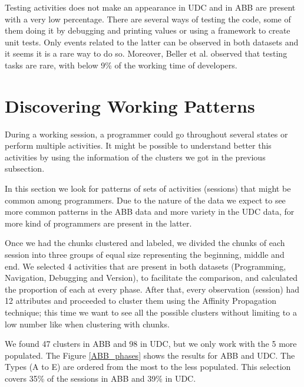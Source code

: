 \documentclass[conference]{IEEEtran}
\begin{document}
Testing activities does not make an appearance in UDC and in ABB are present with a very low percentage. There are several ways of testing the code, some of them doing it by debugging and printing values or using a framework to create unit tests. Only events related to the latter can be observed in both datasets and it seems it is a rare way to do so. Moreover, Beller et al. \cite{BGZ15} observed that testing tasks are rare, with below 9\% of the working time of developers.

\section{Discovering Working Patterns}

During a working session, a programmer could go throughout several states or perform multiple activities. It might be possible to understand better this activities by using the information of the clusters we got in the previous subsection. 

In this section we look for patterns of sets of activities (sessions) that might be common among programmers. Due to the nature of the data we expect to see more common patterns in the ABB data and more variety in the UDC data, for more kind of programmers are present in the latter.

Once we had the chunks clustered and labeled, we divided the chunks of each session into three groups of equal size representing the beginning, middle and end. We selected 4 activities that are present in both datasets (Programming, Navigation, Debugging and Version), to facilitate the comparison, and calculated the proportion of each at every phase. After that, every observation (session) had 12 attributes and proceeded to cluster them using the Affinity Propagation technique; this time we want to see all the possible clusters without limiting to a low number like when clustering with chunks. 

We found 47 clusters in ABB and 98 in UDC, but we only work with the 5 more populated. The Figure \ref{ABB_phases} shows the results for ABB and UDC. The Types (A to E) are ordered from the most to the less populated. This selection covers 35\% of the sessions in ABB and 39\% in UDC. 
\end{document}
